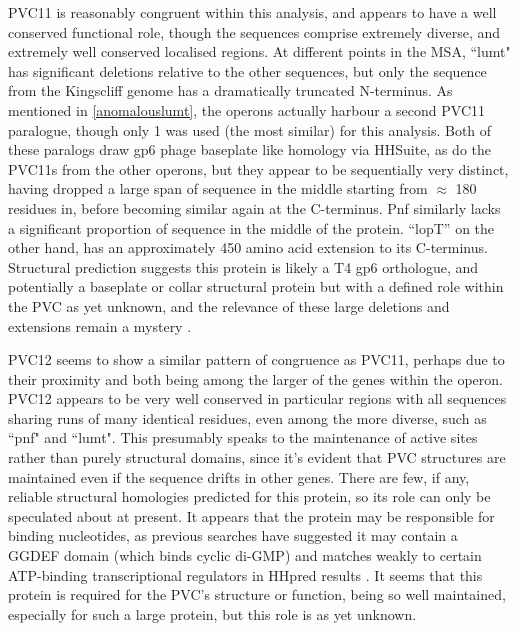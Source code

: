 PVC11 is reasonably congruent within this analysis, and appears to have a well conserved functional role, though the sequences comprise extremely diverse, and extremely well conserved localised regions. At different points in the MSA, ``lumt" has significant deletions relative to the other sequences, but only the sequence from the Kingscliff genome has a dramatically truncated N-terminus. As mentioned in \vref{anomalouslumt}, the operons actually harbour a second PVC11 paralogue, though only 1 was used (the most similar) for this analysis. Both of these paralogs draw gp6 phage baseplate like homology via HHSuite, as do the PVC11s from the other operons, but they appear to be sequentially very distinct, having dropped a large span of sequence in the middle starting from $\approx$ 180 residues in, before becoming similar again at the C-terminus. Pnf similarly lacks a significant proportion of sequence in the middle of the protein. ``lopT'' on the other hand, has an approximately 450 amino acid extension to its C-terminus. Structural prediction suggests this protein is likely a T4 gp6 orthologue, and potentially a baseplate or collar structural protein but with a defined role within the PVC as yet unknown, and the relevance of these large deletions and extensions remain a mystery \citep{Cardarelli2010, Aksyuk2009a}.

PVC12 seems to show a similar pattern of congruence as PVC11, perhaps due to their proximity and both being among the larger of the genes within the operon. PVC12 appears to be very well conserved in particular regions with all sequences sharing runs of many identical residues, even among the more diverse, such as ``pnf" and ``lumt". This presumably speaks to the maintenance of active sites rather than purely structural domains, since it's evident that PVC structures are maintained even if the sequence drifts in other genes. There are few, if any, reliable structural homologies predicted for this protein, so its role can only be speculated about at present. It appears that the protein may be responsible for binding nucleotides, as previous searches have suggested it may contain a GGDEF domain (which binds cyclic di-GMP) and matches weakly to certain ATP-binding transcriptional regulators in HHpred results \citep{Paul2004}. It seems that this protein is required for the PVC's structure or function, being so well maintained, especially for such a large protein, but this role is as yet unknown.


